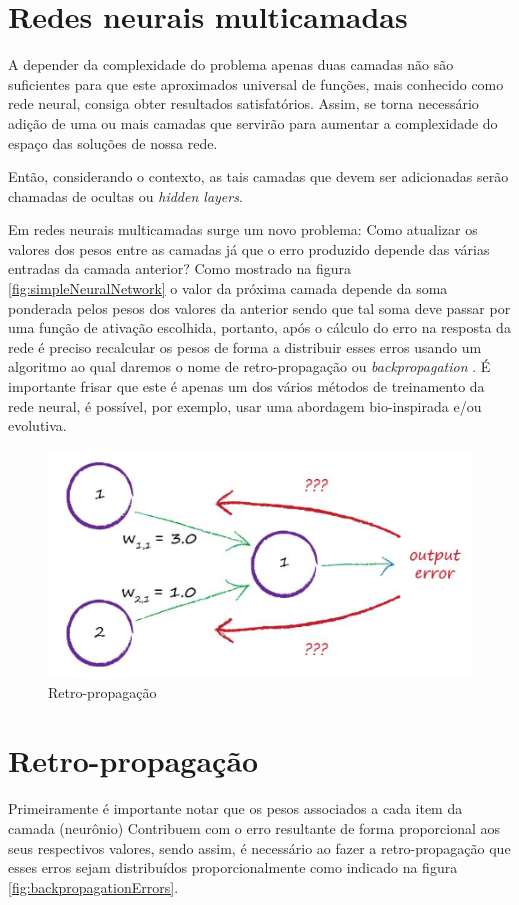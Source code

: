 \begin{apendicesenv}
	\section{Redes neurais multicamadas}
		\par A depender da complexidade do problema apenas duas camadas não são suficientes para que este aproximados universal de funções, mais conhecido como rede neural, consiga obter resultados satisfatórios. Assim, se torna necessário adição de uma ou mais camadas que servirão para aumentar a complexidade do espaço das soluções de nossa rede.
		
		\par Então, considerando o contexto, as tais camadas que devem ser adicionadas serão chamadas de ocultas ou \textit{hidden layers}\cite{rashid2016make}. 
		
		\par Em redes neurais multicamadas surge um novo problema: Como atualizar os valores dos pesos entre as camadas já que o erro produzido depende das várias entradas da camada anterior? Como mostrado na figura \ref{fig:simpleNeuralNetwork} o valor da próxima camada depende da soma ponderada pelos pesos dos valores da anterior sendo que tal soma deve passar por uma função de ativação escolhida, portanto, após o cálculo do erro na resposta da rede é preciso recalcular os pesos de forma a distribuir esses erros usando um algoritmo ao qual daremos o nome de retro-propagação ou \textit{backpropagation} \cite{haykinredes}. É importante frisar que este é apenas um dos vários métodos de treinamento da rede neural, é possível, por exemplo, usar uma abordagem bio-inspirada e/ou evolutiva.
		
		\begin{figure}[H]
			\centering
			\caption{Retro-propagação}
			\label{fig:backpropagation}
			\includegraphics[width=0.7\linewidth]{images/TEMPbackpropagation}
		\end{figure}
	
	\section{Retro-propagação}
		\par Primeiramente é importante notar que os pesos associados a cada item da camada (neurônio) Contribuem com o erro resultante de forma proporcional aos seus respectivos valores, sendo assim, é necessário ao fazer a retro-propagação que esses erros sejam distribuídos proporcionalmente como indicado na figura \ref{fig:backpropagationErrors}.
		

\end{apendicesenv}
